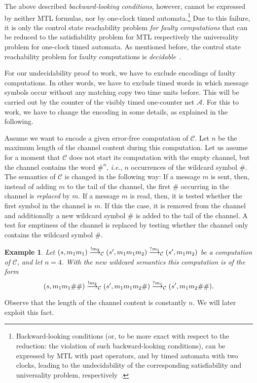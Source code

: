\documentclass{CSML}
\theoremstyle{plain}\newtheorem{theorem}[thm]{Theorem}
\theoremstyle{plain}\newtheorem{corollary}[thm]{Corollary}
\theoremstyle{plain}\newtheorem{example}[thm]{Example}
\theoremstyle{plain}\newtheorem{lemma}[thm]{Lemma}
\theoremstyle{plain}\newtheorem{remark}[thm]{Remark}
\newcommand*\ie{\textit{i.e.}}
\newcommand{\A}{\mathcal{A}}
\newcommand{\cm}{\mathcal{C}}
\begin{document}
The above described \emph{backward-looking conditions}, however, cannot be expressed by neither MTL formulas, nor by one-clock timed automata.\footnote{Backward-looking conditions (or, to be more exact with respect to the reduction: the violation of such backward-looking conditions), can be expressed by MTL with past operators, and by timed automata with two clocks, leading to the undecidability of the corresponding satisfiability and universality problem, respectively~\cite{AD94}.} Due to this failure, it is only the control state reachability problem \emph{for faulty computations} that can be reduced to the satisfiability problem for MTL respectively the universality problem for one-clock timed automata. As mentioned before, the control state reachability problem for faulty computations is \emph{decidable}~\cite{DBLP:journals/fuin/AbdullaDOQW08}.

For our undecidability proof to work,
we have to exclude encodings of faulty computations. 
In other words, we have to exclude timed words in which message symbols occur without any matching copy two time units before. 
This will be carried out by the counter of the visibly timed one-counter net $\A$. 
For this to work, we have to change the encoding in some details, as explained in the following. 







Assume we want to encode a given error-free computation of $\cm$. 
Let $n$ be the maximum length of the channel content during this computation. 
Let us assume for a moment that $\cm$ does not start its computation with the empty channel, but the channel contains the word $\#^n$, \ie, $n$ occurrences of the wildcard symbol $\#$. The semantics of $\cm$ is changed in the following way: If a message $m$ is sent, then, instead of adding $m$ to the tail of the channel, the first $\#$ occurring in the channel is \emph{replaced} by $m$. 
If a message $m$ is read, then, it is tested whether the first symbol in the channel is $m$. If this the case, it is removed from the channel and additionally a new wildcard symbol $\#$  is added to the tail of the channel. 
A test for emptiness of the channel is replaced by testing whether the channel only contains the wildcard symbol $\#$. 
\begin{example}
	Let $(s,m_1m_1)\buildrel!m_2\over\longrightarrow_\cm(s',m_1m_1m_2)\buildrel ?m_1\over\longrightarrow_\cm(s',m_1m_2)$ be a computation of $\cm$, and let $n=4$. 
	With the new wildcard semantics this computation is of the form
	$$(s,m_1m_1\#\#)\buildrel!m_2\over\longrightarrow_\cm(s',m_1m_1m_2\#)\buildrel ?m_1\over\longrightarrow_\cm(s',m_1m_2\#\#).$$
\end{example}
Observe that the length of the channel content is constantly $n$. 
We will later exploit this fact. 
\end{document}
